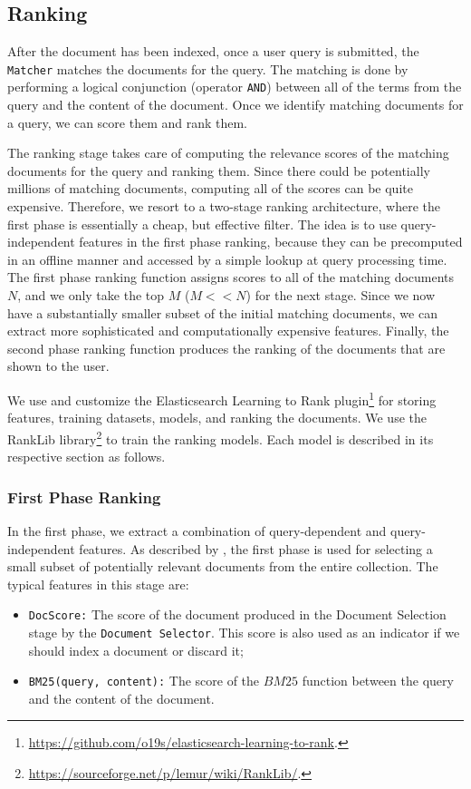 \subsection{Ranking}
After the document has been indexed, once a user query is submitted, the \texttt{Matcher} matches the documents for the query. The matching is done by performing a logical conjunction (operator \texttt{AND}) between all of the terms from the query and the content of the document. Once we identify matching documents for a query, we can score them and rank them.

The ranking stage takes care of computing the relevance scores of the matching documents for the query and ranking them. Since there could be potentially millions of matching documents, computing all of the scores can be quite expensive. Therefore, we resort to a two-stage ranking architecture, where the first phase is essentially a cheap, but effective filter. The idea is to use query-independent features in the first phase ranking, because they can be precomputed in an offline manner and accessed by a simple lookup at query processing time. The first phase ranking function assigns scores to all of the matching documents $N$, and we only take the top $M$ ($M << N$) for the next stage. Since we now have a substantially smaller subset of the initial matching documents, we can extract more sophisticated and computationally expensive features. Finally, the second phase ranking function produces the ranking of the documents that are shown to the user.

We use and customize the Elasticsearch Learning to Rank plugin\footnote{\url{https://github.com/o19s/elasticsearch-learning-to-rank}.} for storing features, training datasets, models, and ranking the documents. We use the RankLib library\footnote{\url{https://sourceforge.net/p/lemur/wiki/RankLib/}.} to train the ranking models. Each model is described in its respective section as follows.

\subsubsection{First Phase Ranking}
In the first phase, we extract a combination of query-dependent and query-independent features. As described by \citet{cambazoglu2010early}, the first phase is used for selecting a small subset of potentially relevant documents from the entire collection. The typical features in this stage are:
\begin{itemize}
	\item \texttt{DocScore:} The score of the document produced in the Document Selection stage by the \texttt{Document Selector}. This score is also used as an indicator if we should index a document or discard it;
    \item \texttt{BM25(query, content):} The score of the $BM25$ function between the query and the content of the document.
\end{itemize}

